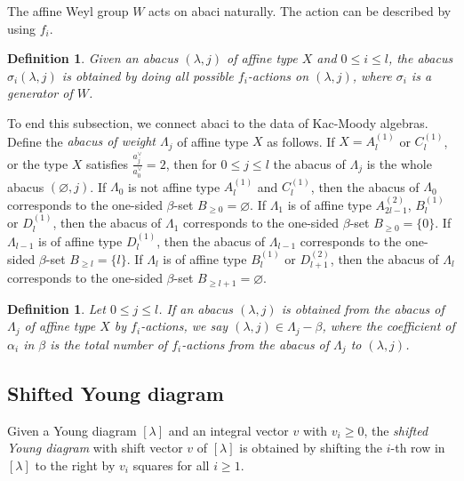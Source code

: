 \documentclass[11pt]{amsart}
\theoremstyle{plain}
\numberwithin{equation}{subsection}
\newtheorem{definition}[theorem]{Definition}
\newcommand{\lam}{\lambda}
\begin{document}
The affine Weyl group $W$ acts on abaci naturally. The action can be described by using $f_i$.

\begin{definition}\label{2.7}
Given an abacus $(\lam, j)$ of affine type $X$ and $0\leq i\leq l$, 
the abacus $\sigma_i(\lam, j)$ is obtained by doing all possible $f_i$-actions on $(\lam, j)$,
where $\sigma_i$ is a generator of $W$.
\end{definition}

To end this subsection, we connect abaci to the data of Kac-Moody algebras. Define the {\em abacus of weight $\Lambda_j$} of affine type $X$ as follows.
If $X=A_l^{(1)}$ or $C_l^{(1)}$, or the type $X$ satisfies $\frac{a_j^\vee}{a_0^\vee}=2$, then for $0\leq j\leq l$ the abacus of $\Lambda_j$ is the whole abacus $(\varnothing, j)$.
If $\Lambda_0$ is not affine type $A_l^{(1)}$ and $C_l^{(1)}$, then the abacus of $\Lambda_0$ corresponds to the one-sided $\beta$-set $B_{\geq 0}=\varnothing$.
If $\Lambda_1$ is of affine type $A_{2l-1}^{(2)}$, $B_l^{(1)}$ or $D_l^{(1)}$, then the abacus of $\Lambda_1$ corresponds to the one-sided $\beta$-set $B_{\geq 0}=\{0\}$.
If $\Lambda_{l-1}$ is of affine type $D_l^{(1)}$, then the abacus of $\Lambda_{l-1}$ corresponds to the one-sided $\beta$-set $B_{\geq l}=\{l\}$.
If $\Lambda_{l}$ is of affine type $B_l^{(1)}$ or $ D_{l+1}^{(2)}$, then the abacus of $\Lambda_{l}$ corresponds to the one-sided $\beta$-set $B_{\geq l+1}=\varnothing$.

\begin{definition}\label{2.6}
Let $0\leq j\leq l$. If an abacus $(\lam, j)$ is obtained from the abacus of $\Lambda_j$ of affine type $X$ by $f_i$-actions, 
we say $(\lam, j)\in \Lambda_j-\beta$, where the coefficient of $\alpha_i$ in $\beta$ is the total number of 
$f_i$-actions from the abacus of $\Lambda_j$ to $(\lam, j)$.
\end{definition}

\smallskip


\subsection{Shifted Young diagram}
Given a Young diagram $[\lam]$ and an integral vector $v$ with $v_i\geq 0$, the {\em shifted Young diagram} with shift vector $v$ of $[\lam]$ is
obtained by shifting the $i$-th row in $[\lam]$ to the right by $v_i$ squares for all $i \geq 1$. 
\end{document}
